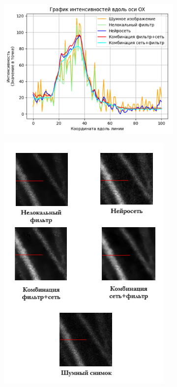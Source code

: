 \begin{figure}[H]
	\begin{subfigure}[t]{0.6\textwidth\relax}
		\centering
		\includegraphics[width=.95\linewidth,valign=t]{my_folder/images/denoising/intensity_test1.png}
	\end{subfigure}
	\hfill %
	\begin{subfigure}[t]{0.3\textwidth\relax}
		\centering
		\includegraphics[width=.95\linewidth,valign=t]{my_folder/images/denoising/intensity_test1_images.png}

\end{subfigure}
\end{figure}
